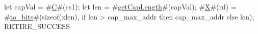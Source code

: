 let capVal = #\hyperref[sailRISCVzC]{C}#(cs1);
let len = #\hyperref[sailRISCVzgetCapLength]{getCapLength}#(capVal);
#\hyperref[sailRISCVzX]{X}#(rd) = #\hyperref[sailRISCVztozybits]{to\_bits}#(sizeof(xlen), if len > cap_max_addr then cap_max_addr else len);
RETIRE_SUCCESS
